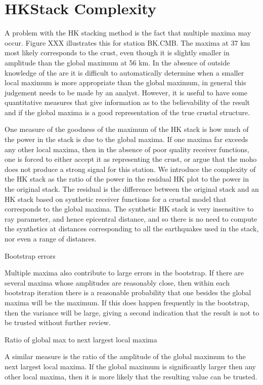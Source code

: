 \documentclass[titlepage]{article}
\begin{document}
\section{HKStack Complexity}

A problem with the HK stacking method is the fact that multiple maxima may occur. Figure XXX
 illustrates this for station BK.CMB. The maxima at 37 km most likely corresponds to the crust, even though it is slightly smaller in amplitude than the global maximum at 56 km. In the absence of outside knowledge of the are it is difficult to automatically determine when a smaller local maximum is more appropriate than the global maximum, in general this judgement needs to be made by an analyst. However, it is useful to have some quantitative measures that give information as to the believability of the result and if the global maxima is a good representation of the true crustal structure.

One measure of the goodness of the maximum of the HK stack is how much of the power in the stack is due to the global maxima. If one maxima far exceeds any other local maxima, then in the absence of poor quality receiver functions, one is forced to either accept it as representing the crust, or argue that the moho does not produce a strong signal for this station. We introduce the complexity of the HK stack as the ratio of the power in the residual HK plot to the power in the original stack. The residual is the difference between the original stack and an HK stack based on synthetic receiver functions for a crustal model that corresponds to the global maxima. The synthetic HK stack is very insensitive to ray parameter, and hence epicentral distance, and so there is no need to compute the synthetics at distances corresponding to all the earthquakes used in the stack, nor even a range of distances. 

Bootstrap errors

Multiple maxima also contribute to large errors in the bootstrap. If there are several maxima whose amplitudes are reasonably close, then within each bootstrap iteration there is a reasonable probability that one besides the global maxima will be the maximum. If this does happen frequently in the bootstrap, then the variance will be large, giving a second indication that the result is not to be trusted without further review.

Ratio of global max to next largest local maxima

A similar measure is the ratio of the amplitude of the global maximum to the next largest local maxima. If the global maximum is significantly larger then any other local maxima, then it is more likely that the resulting value can be trusted.
\end{document}
